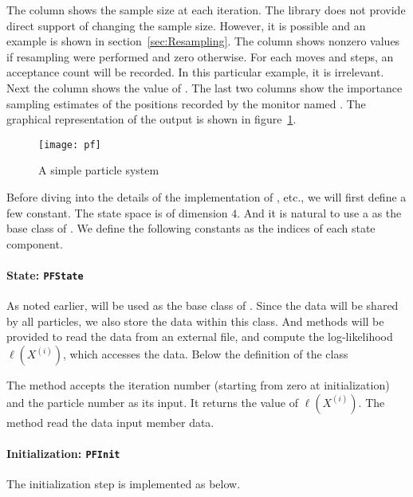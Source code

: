 The column  shows the sample size at each iteration. The
library does not provide direct support of changing the sample size. However,
it is possible and an example is shown in section~\ref{sec:Resampling}. The
column  shows nonzero values if resampling were performed
and zero otherwise. For each moves and \mcmc steps, an acceptance count will be
recorded. In this particular example, it is irrelevant. Next the column
 shows the value of \ess. The last two columns show the
importance sampling estimates of the positions recorded by the monitor named
. The graphical representation of the output is shown in
figure~\ref{fig:pf}.

\begin{figure}
  \texttt{[image: pf]}
  \caption{A simple particle system}
  \label{fig:pf}
\end{figure}

Before diving into the details of the implementation of ,
etc., we will first define a few constant. The state space is of dimension $4$.
And it is natural to use a  as the base class of
. We define the following constants as the indices of each
state component.

\paragraph{State: \texttt{PFState}}

As noted earlier,  will be used as the base class of
. Since the data will be shared by all particles, we also
store the data within this class. And methods will be provided to read the data
from an external file, and compute the log-likelihood $\ell(X^{(i)})$, which
accesses the data. Below the definition of the class 

The method  accepts the iteration number (starting
from zero at initialization) and the particle number as its input. It returns
the value of $\ell(X^{(i)})$. The method  read the data
input member data.

\paragraph{Initialization: \texttt{PFInit}}

The initialization step is implemented as below.


